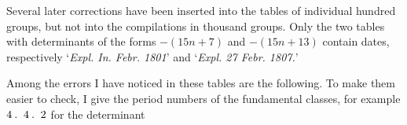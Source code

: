 Several later corrections have been inserted into the tables of individual hundred groups, but not into the compilations in thousand groups. Only the two tables with determinants of the forms $-(15n+7)$ and $-(15n+13)$ contain dates, respectively ‘\textit{Expl. In. Febr. 1801}’ and ‘\textit{Expl. 27 Febr. 1807.}’
\par Among the errors I have noticed in these tables are the following. To make them easier to check, I give the period numbers of the fundamental classes, for example $4\pdot\ 4\pdot\ 2$ for the determinant
